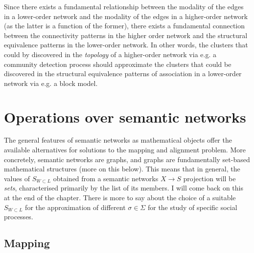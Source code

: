 Since there exists a fundamental relationship between the modality of the edges in a lower-order network and the modality of the edges in a higher-order network (as the latter is a function of the former), there exists a fundamental connection between the connectivity patterns in the higher order network and the structural equivalence patterns in the lower-order network.
In other words, the clusters that could by discovered in the \emph{topology} of a higher-order network via e.g. a community detection process should approximate the clusters that could be discovered in the structural equivalence patterns of association in a lower-order network via e.g. a block model.

\section{Operations over semantic networks}
\label{sec:semnet_ops}

The general features of semantic networks as mathematical objects offer the available alternatives for solutions to the mapping and alignment problem.
More concretely, semantic networks are graphs, and graphs are fundamentally set-based mathematical structures (more on this below).
This means that in general, the values of $S_{W \subset L}$ obtained from a semantic networks $X \rightarrow S$ projection will be \emph{sets}, characterised primarily by the list of its members.
I will come back on this at the end of the chapter.
There is more to say about the choice of a suitable $S_{W \subset L}$ for the approximation of different $\sigma \in \Sigma$ for the study of specific social processes.%

\subsection{Mapping}

